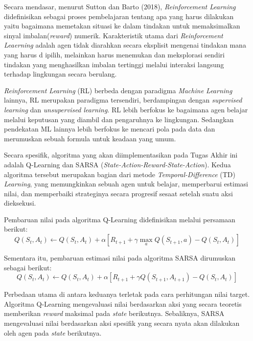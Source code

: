 \documentclass[a4paper,twoside]{article}
\begin{document}
	Secara mendasar, menurut Sutton dan Barto (2018), \textit{Reinforcement Learning} didefinisikan sebagai proses pembelajaran tentang apa yang harus dilakukan yaitu bagaimana memetakan situasi ke dalam tindakan untuk memaksimalkan sinyal imbalan(\textit{reward}) numerik. Karakteristik utama dari \textit{Reinforcement Leaerning} adalah agen tidak diarahkan secara eksplisit mengenai tindakan mana yang harus d 	ipilih, melainkan harus menemukan dan meksplorasi sendiri tindakan yang menghasilkan imbalan tertinggi melalui interaksi langsung terhadap lingkungan secara berulang.
	
	\textit{Reinforcement Learning} (RL) berbeda dengan paradigma \textit{Machine Learning} lainnya, RL merupakan paradigma tersendiri, berdampingan dengan \textit{supervised learning} dan \textit{unsupervised learning}. RL lebih berfokus ke bagaimana agen belajar melalui keputusan yang diambil dan pengaruhnya ke lingkungan. Sedangkan pendekatan ML lainnya lebih berfokus ke mencari pola pada data dan merumuskan sebuah formula untuk keadaan yang umum.
	
	Secara spesifik, algoritma yang akan diimplementasikan pada Tugas Akhir ini adalah Q-Learning dan SARSA (\textit{State-Action-Reward-State-Action}). Kedua algoritma tersebut merupakan bagian dari metode \textit{Temporal-Difference} (TD) \textit{Learning}, yang memungkinkan sebuah agen untuk belajar, memperbarui estimasi nilai, dan memperbaiki strateginya secara progresif sesaat setelah suatu aksi dieksekusi.
	
	Pembaruan nilai pada algoritma Q-Learning didefinisikan melalui persamaan berikut:
	\begin{equation}
		Q(S_t, A_t) \leftarrow Q(S_t, A_t) + \alpha \left[ R_{t+1} + \gamma \max_{a} Q(S_{t+1}, a) - Q(S_t, A_t) \right]
	\end{equation}
	
	Sementara itu, pembaruan estimasi nilai pada algoritma SARSA dirumuskan sebagai berikut:
	\begin{equation}
		Q(S_t, A_t) \leftarrow Q(S_t, A_t) + \alpha \left[ R_{t+1} + \gamma Q(S_{t+1}, A_{t+1}) - Q(S_t, A_t) \right]
	\end{equation}
	
	Perbedaan utama di antara keduanya terletak pada cara perhitungan nilai target. Algoritma Q-Learning mengevaluasi nilai berdasarkan aksi yang secara teoretis memberikan \textit{reward} maksimal pada \textit{state} berikutnya. Sebaliknya, SARSA mengevaluasi nilai berdasarkan aksi spesifik yang secara nyata akan dilakukan oleh agen pada \textit{state} berikutnya.
		
\end{document}
